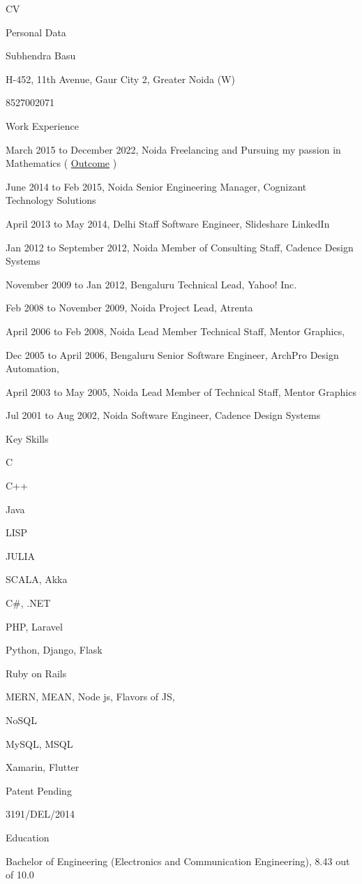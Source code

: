 \documentclass{scrartcl}
\begin{document}
\begin{cv}{CV}
\begin{cvlist}{Personal Data}
\item Subhendra Basu
\item H-452, 11th Avenue, Gaur City 2, Greater Noida (W)
\item 8527002071
\end{cvlist}

\begin{cvlist}{Work Experience}
\item{March 2015 to December 2022, Noida} Freelancing and Pursuing my passion in Mathematics
	( \href{https://www.dropbox.com/s/8hrsvfw2y9r5f6f/final%20manuscript%202003%2C2022.pdf?dl=0}{Outcome} )
\item{June 2014 to Feb 2015, Noida} 
	Senior Engineering Manager, Cognizant Technology Solutions
\item{April 2013 to May 2014, Delhi}
	Staff Software Engineer, Slideshare LinkedIn
\item{Jan 2012 to September 2012, Noida} 
	Member of Consulting Staff, Cadence Design Systems
\item{November 2009 to Jan 2012, Bengaluru} 
	Technical Lead, Yahoo! Inc.
\item{Feb 2008 to November 2009, Noida} 
	Project Lead, Atrenta
\item{April 2006 to Feb 2008, Noida} 
	Lead Member Technical Staff, Mentor Graphics, 
\item{Dec 2005 to April 2006, Bengaluru} 
	Senior Software Engineer, ArchPro Design Automation,
\item{April 2003 to May 2005, Noida} 
	Lead Member of Technical Staff, Mentor Graphics
\item{Jul 2001 to Aug 2002, Noida} 
	Software Engineer, Cadence Design Systems 
\end{cvlist}

\begin{cvlist}{Key Skills}
\item C
\item C++
\item Java
\item LISP
\item JULIA
\item SCALA, Akka
\item C\#, .NET
\item PHP, Laravel
\item Python, Django, Flask
\item Ruby on Rails
\item MERN, MEAN, Node js, Flavors of JS, 
\item NoSQL
\item MySQL, MSQL
\item Xamarin, Flutter
\end{cvlist}

\begin{cvlist}{Patent Pending}
\item 3191/DEL/2014
\end{cvlist}

\begin{cvlist}{Education}
\item Bachelor of Engineering (Electronics and Communication Engineering), 8.43 out of 10.0
\end{cvlist}
\end{cv}
\end{document}
